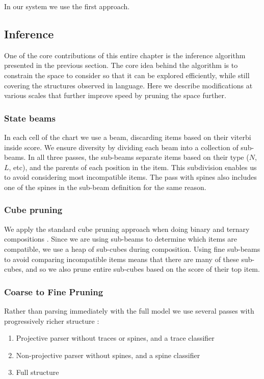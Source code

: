 In our system we use the first approach.

\subsection{Inference}

One of the core contributions of this entire chapter is the inference algorithm presented in the previous section.
The core idea behind the algorithm is to constrain the space to consider so that it can be explored efficiently, while still covering the structures observed in language.
Here we describe modifications at various scales that further improve speed by pruning the space further.

\subsubsection{State beams}

In each cell of the chart we use a beam, discarding items based on their viterbi inside score.
We ensure diversity by dividing each beam into a collection of sub-beams.
In all three passes, the sub-beams separate items based on their type ($N$, $L$, etc), and the parents of each position in the item.
This subdivision enables us to avoid considering most incompatible items.
The pass with spines also includes one of the spines in the sub-beam definition for the same reason.

\subsubsection{Cube pruning}

We apply the standard cube pruning approach when doing binary and ternary compositions \parencite{Chiang:2007}.
Since we are using sub-beams to determine which items are compatible, we use a heap of sub-cubes during composition.
Using fine sub-beams to avoid comparing incompatible items means that there are many of these sub-cubes, and so we also prune entire sub-cubes based on the score of their top item.

\subsubsection{Coarse to Fine Pruning}

Rather than parsing immediately with the full model we use several passes with progressively richer structure \parencite{Goodman:1997}:

\begin{enumerate}
  \item Projective parser without traces or spines, and a trace classifier
  \item Non-projective parser without spines, and a spine classifier
  \item Full structure
\end{enumerate}

